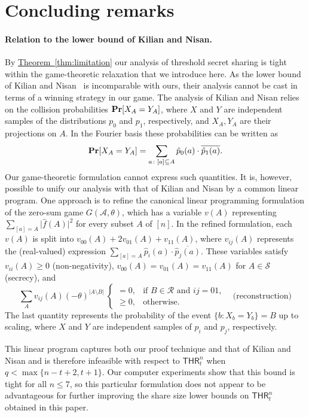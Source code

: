\documentclass[11pt]{article}
\numberwithin{equation}{section}
\theoremstyle{definition}
\theoremstyle{plain}
\newcommand{\expref}[2]{\hyperref[#2]{#1~\ref{#2}}}
\DeclareMathOperator\pr{\mathop{\bf Pr}}
\newcommand{\thr}[2]{\mathsf{THR}_{#1}^{#2}}
\providecommand\abs[1]{\lvert#1\rvert}
\begin{document}
\section{Concluding remarks}

\paragraph{Relation to the lower bound of Kilian and Nisan.}
By \expref{Theorem}{thm:limitation} our analysis of threshold secret sharing is tight within the game-theoretic relaxation that we introduce here.  As the lower bound of Kilian and Nisan~\cite{KilianN90} is incomparable with ours, their analysis cannot be cast in terms of a winning strategy in our game.  The analysis of Kilian and Nisan relies on the collision probabilities $\pr[X_A = Y_A]$, where $X$ and $Y$ are independent samples of the distributions $p_0$ and $p_1$, respectively, and $X_A, Y_A$ are their projections on $A$.  In the Fourier basis these probabilities can be written as
\[
\pr[X_A = Y_A] = \sum_{a\colon [a] \subseteq A} \hat{p}_0(a) \cdot \overline{\hat{p}_1(a)}.
\]
Our game-theoretic formulation cannot express such quantities.  It is, however, 
 possible to unify our analysis with that of Kilian and Nisan by a common linear program.  One approach is to refine the canonical linear programming formulation of the zero-sum game $G(\mathcal{A}, \theta)$, which has a variable $v(A)$ representing $\sum_{[a] = A} \abs{\hat{f}(A)}^2$ for every subset $A$ of $[n]$.  In the refined formulation, each $v(A)$ is split into $v_{00}(A) + 2v_{01}(A) + v_{11}(A)$, where $v_{ij}(A)$ represents the (real-valued) expression $\sum_{[a] = A} \hat{p}_i(a) \cdot \overline{\hat{p}_j(a)}$.  These variables satisfy $v_{ii}(A) \geq 0$ (non-negativity), $v_{00}(A) = v_{01}(A) = v_{11}(A)$ for $A \in \mathcal{S}$ (secrecy), and
\[  \sum_A v_{ij}(A) (-\theta)^{\abs{A \setminus B}} \ 
\begin{cases}
= 0, &\text{if $B \in \mathcal{R}$ and $ij = 01$,} \\
\geq 0, &\text{otherwise}.
\end{cases} 
\quad\text{(reconstruction)}
\]
The last quantity represents the probability of the event $\{b\colon X_b = Y_b\} = B$ up to scaling, where $X$ and $Y$ are independent samples of $p_i$ and $p_j$, respectively.

This linear program captures both our proof technique and that of Kilian and Nisan and is therefore infeasible with respect to $\thr{t}{n}$ when $q < \max\{n - t + 2, t + 1\}$. Our computer experiments show that this bound is tight for all $n \leq 7$, so this particular formulation does not appear to be advantageous for further improving the share size lower bounds on $\thr{t}{n}$ obtained in this paper.
\end{document}
